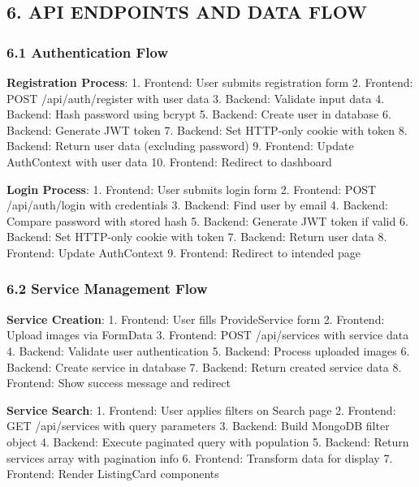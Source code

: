 \documentclass[12pt,a4paper]{article}
\begin{document}
\hypertarget{api-endpoints-and-data-flow}{%
\subsection{6. API ENDPOINTS AND DATA
FLOW}\label{api-endpoints-and-data-flow}}

\hypertarget{authentication-flow}{%
\subsubsection{6.1 Authentication Flow}\label{authentication-flow}}

\textbf{Registration Process}: 1. Frontend: User submits registration
form 2. Frontend: POST /api/auth/register with user data 3. Backend:
Validate input data 4. Backend: Hash password using bcrypt 5. Backend:
Create user in database 6. Backend: Generate JWT token 7. Backend: Set
HTTP-only cookie with token 8. Backend: Return user data (excluding
password) 9. Frontend: Update AuthContext with user data 10. Frontend:
Redirect to dashboard

\textbf{Login Process}: 1. Frontend: User submits login form 2.
Frontend: POST /api/auth/login with credentials 3. Backend: Find user by
email 4. Backend: Compare password with stored hash 5. Backend: Generate
JWT token if valid 6. Backend: Set HTTP-only cookie with token 7.
Backend: Return user data 8. Frontend: Update AuthContext 9. Frontend:
Redirect to intended page

\hypertarget{service-management-flow}{%
\subsubsection{6.2 Service Management
Flow}\label{service-management-flow}}

\textbf{Service Creation}: 1. Frontend: User fills ProvideService form
2. Frontend: Upload images via FormData 3. Frontend: POST /api/services
with service data 4. Backend: Validate user authentication 5. Backend:
Process uploaded images 6. Backend: Create service in database 7.
Backend: Return created service data 8. Frontend: Show success message
and redirect

\textbf{Service Search}: 1. Frontend: User applies filters on Search
page 2. Frontend: GET /api/services with query parameters 3. Backend:
Build MongoDB filter object 4. Backend: Execute paginated query with
population 5. Backend: Return services array with pagination info 6.
Frontend: Transform data for display 7. Frontend: Render ListingCard
components
\end{document}
